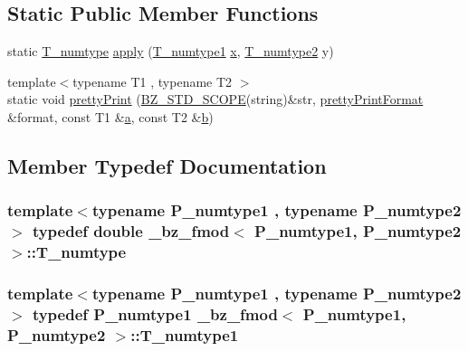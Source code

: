 \subsection*{Static Public Member Functions}
\begin{DoxyCompactItemize}
\item 
static \hyperlink{class__bz__fmod_a8c47d5a70c382ccce460c68292c01c6a}{T\+\_\+numtype} \hyperlink{class__bz__fmod_a915b410be125e8f7001733d500a7954c}{apply} (\hyperlink{class__bz__fmod_a07f37189d3725953692a5a02ec49a8b0}{T\+\_\+numtype1} \hyperlink{vecnorm1_8cc_ac73eed9e41ec09d58f112f06c2d6cb63}{x}, \hyperlink{class__bz__fmod_a6e0f754063c23e1a96a6c9fb90582e35}{T\+\_\+numtype2} y)
\item 
{\footnotesize template$<$typename T1 , typename T2 $>$ }\\static void \hyperlink{class__bz__fmod_afd016e1a3735b7c9d894d99eed1ce295}{pretty\+Print} (\hyperlink{numinquire_8h_a2b24ffc3b4ef9803956bc7715c6c7b83}{B\+Z\+\_\+\+S\+T\+D\+\_\+\+S\+C\+O\+P\+E}(string)\&str, \hyperlink{classprettyPrintFormat}{pretty\+Print\+Format} \&format, const T1 \&\hyperlink{gen__mat5files_8m_aae328bf20413f220e38aec4d95bfd6da}{a}, const T2 \&\hyperlink{gen__mat5files_8m_a7b38767b3b6a8dae167e5afa4fc340b0}{b})
\end{DoxyCompactItemize}


\subsection{Member Typedef Documentation}
\hypertarget{class__bz__fmod_a8c47d5a70c382ccce460c68292c01c6a}{}
\subsubsection[{T\+\_\+numtype}]{\setlength{\rightskip}{0pt plus 5cm}template$<$typename P\+\_\+numtype1 , typename P\+\_\+numtype2 $>$ typedef double {\bf \+\_\+bz\+\_\+fmod}$<$ P\+\_\+numtype1, P\+\_\+numtype2 $>$\+::{\bf T\+\_\+numtype}}\label{class__bz__fmod_a8c47d5a70c382ccce460c68292c01c6a}
\hypertarget{class__bz__fmod_a07f37189d3725953692a5a02ec49a8b0}{}
\subsubsection[{T\+\_\+numtype1}]{\setlength{\rightskip}{0pt plus 5cm}template$<$typename P\+\_\+numtype1 , typename P\+\_\+numtype2 $>$ typedef P\+\_\+numtype1 {\bf \+\_\+bz\+\_\+fmod}$<$ P\+\_\+numtype1, P\+\_\+numtype2 $>$\+::{\bf T\+\_\+numtype1}}\label{class__bz__fmod_a07f37189d3725953692a5a02ec49a8b0}
\hypertarget{class__bz__fmod_a6e0f754063c23e1a96a6c9fb90582e35}{}
